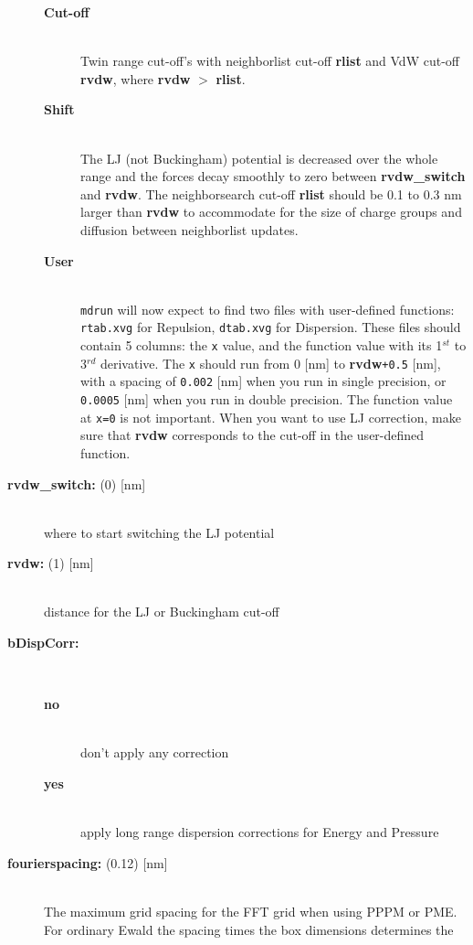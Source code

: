 \begin{description}
\begin{description}
\item[{\bf Cut-off}]\mbox{}\\
Twin range cut-off's with neighborlist cut-off {\bf rlist} and 
VdW cut-off {\bf rvdw},
where {\bf rvdw} {\tt $>$} {\bf rlist}.
\item[{\bf Shift}]\mbox{}\\
The LJ (not Buckingham)
potential is decreased over the whole range and the forces decay smoothly
to zero between {\bf rvdw\_switch} and {\bf rvdw}.
The neighborsearch cut-off {\bf rlist} should be 0.1 to 0.3 nm larger than
{\bf rvdw} to accommodate for the size of charge groups and diffusion
between neighborlist updates.
\item[{\bf User}]\mbox{}\\
{\tt mdrun} will now expect to find two files with user-defined
functions: {\tt rtab.xvg} for Repulsion, {\tt dtab.xvg} for Dispersion.
These files should contain 5 columns:
the {\tt x} value, and the function value with its 1$^{st}$
to 3$^{rd}$ derivative. The {\tt x} should run from 0 [nm] to
{\bf rvdw}{\tt +0.5} [nm], with a spacing of {\tt 0.002}
[nm] when you run in single precision, or {\tt 0.0005} [nm] when
you run in double precision. The function value at {\tt x=0} is not
important. When you want to use LJ correction, make sure that {\bf rvdw}
corresponds to the cut-off in the user-defined function.
\end{description}
\item[{\bf rvdw\_switch: }(0) {[nm]}]\mbox{}\\
where to start switching the LJ potential
\item[{\bf rvdw: }(1) {[nm]}]\mbox{}\\
distance for the LJ or Buckingham cut-off
\item[{\bf bDispCorr:}]\mbox{}\\
\vspace{-2ex}\begin{description}
\item[{\bf no}]\mbox{}\\
don't apply any correction
\item[{\bf yes}]\mbox{}\\
apply long range dispersion corrections for Energy and Pressure
\end{description}
\item[{\bf fourierspacing: }(0.12) {[nm]}]\mbox{}\\
The maximum grid spacing for the FFT grid when using PPPM or PME.
For ordinary Ewald the spacing times the box dimensions determines the

\end{description}
